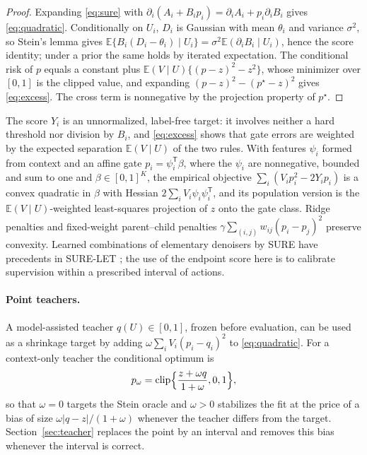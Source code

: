 \documentclass[11pt]{article}
\theoremstyle{plain}
\theoremstyle{definition}
\theoremstyle{remark}
\newcommand{\E}{\mathbb E}
\DeclareMathOperator{\clip}{clip}
\begin{document}
\begin{proof}
Expanding \eqref{eq:sure} with $\partial_i(A_i+B_ip_i)=\partial_iA_i+p_i\partial_iB_i$ gives
\eqref{eq:quadratic}. Conditionally on $U_i$, $D_i$ is Gaussian with mean $\theta_i$ and
variance $\sigma^2$, so Stein's lemma gives $\E\{B_i(D_i-\theta_i)\mid U_i\}
=\sigma^2\E(\partial_iB_i\mid U_i)$, hence the score identity; under a prior the same
holds by iterated expectation. The conditional risk of $p$ equals a constant plus
$\E(V\mid U)\{(p-z)^2-z^2\}$, whose minimizer over $[0,1]$ is the clipped value, and
expanding $(p-z)^2-(p^\star-z)^2$ gives \eqref{eq:excess}. The cross term is nonnegative by
the projection property of $p^\star$.
\end{proof}

The score $Y_i$ is an unnormalized, label-free target: it involves neither a hard threshold
nor division by $B_i$, and \eqref{eq:excess} shows that gate errors are weighted by the
expected separation $\E(V\mid U)$ of the two rules. With features $\psi_i$ formed from
context and an affine gate $p_i=\psi_i^{\mathsf T}\beta$, where the $\psi_i$ are nonnegative,
bounded and sum to one and $\beta\in[0,1]^K$, the empirical objective
$\sum_i(V_ip_i^2-2Y_ip_i)$ is a convex quadratic in $\beta$ with Hessian
$2\sum_iV_i\psi_i\psi_i^{\mathsf T}$, and its population version is the $\E(V\mid U)$-weighted
least-squares projection of $z$ onto the gate class. Ridge penalties and fixed-weight
parent--child penalties $\gamma\sum_{(i,j)}w_{ij}(p_i-p_j)^2$ preserve convexity. Learned
combinations of elementary denoisers by SURE have precedents in SURE-LET
\citep{luisier2007sure}; the use of the endpoint score here is to calibrate supervision
within a prescribed interval of actions.

\paragraph{Point teachers.} A model-assisted teacher $q(U)\in[0,1]$, frozen before
evaluation, can be used as a shrinkage target by adding $\omega\sum_iV_i(p_i-q_i)^2$ to
\eqref{eq:quadratic}. For a context-only teacher the conditional optimum is
\begin{equation}\label{eq:pointteacher}
p_\omega=\clip\Bigl\{\frac{z+\omega q}{1+\omega},0,1\Bigr\},
\end{equation}
so that $\omega=0$ targets the Stein oracle and $\omega>0$ stabilizes the fit at the price
of a bias of size $\omega|q-z|/(1+\omega)$ whenever the teacher differs from the target.
Section~\ref{sec:teacher} replaces the point by an interval and removes this bias whenever
the interval is correct.
\end{document}
